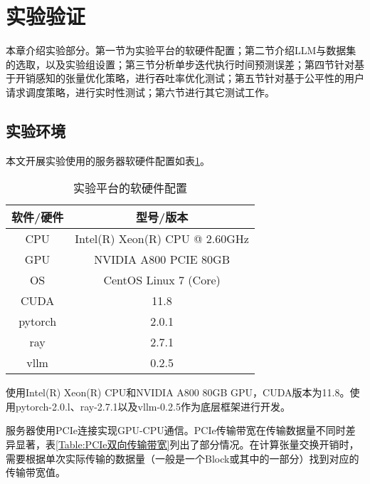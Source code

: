 \section{实验验证}
本章介绍实验部分。第一节为实验平台的软硬件配置；第二节介绍LLM与数据集的选取，以及实验组设置；第三节分析单步迭代执行时间预测误差；第四节针对基于开销感知的张量优化策略，进行吞吐率优化测试；第五节针对基于公平性的用户请求调度策略，进行实时性测试；第六节进行其它测试工作。

\subsection{实验环境}
本文开展实验使用的服务器软硬件配置如表\ref{Table:实验平台的软硬件配置}。

\begin{table}[H]
  \centering
  \caption{实验平台的软硬件配置}
  \label{Table:实验平台的软硬件配置}
  \renewcommand{\arraystretch}{1.2}
  \small
  \begin{tabular}{c c}
    \toprule
    \textbf{软件/硬件} & \textbf{型号/版本} \\ 
    \midrule
    CPU & Intel(R) Xeon(R) CPU @ 2.60GHz  \\ 
    GPU & NVIDIA A800 PCIE 80GB \\ 
    OS & CentOS Linux 7 (Core) \\ 
    CUDA & 11.8 \\ 
    pytorch & 2.0.1 \\ 
    ray & 2.7.1 \\
    vllm & 0.2.5 \\ 
    \bottomrule
  \end{tabular}
\end{table}

使用Intel(R) Xeon(R) CPU和NVIDIA A800 80GB GPU，CUDA版本为11.8。使用pytorch-2.0.l、ray-2.7.1以及vllm-0.2.5作为底层框架进行开发。 
\par
服务器使用PCIe连接实现GPU-CPU通信。PCIe传输带宽在传输数据量不同时差异显著，表\ref{Table:PCIe双向传输带宽}列出了部分情况。在计算张量交换开销时，需要根据单次实际传输的数据量（一般是一个Block或其中的一部分）找到对应的传输带宽值。


